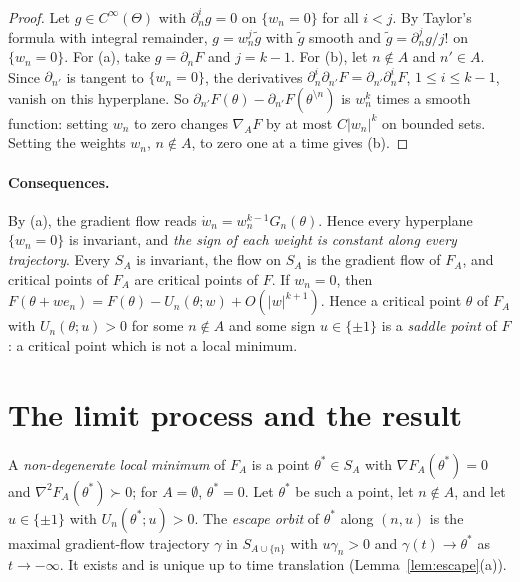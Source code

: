 \documentclass[11pt]{article}
\theoremstyle{definition}
\theoremstyle{remark}
\newcommand{\sm}{\setminus}
\begin{document}
\begin{proof}
Let $g\in C^\infty(\Theta)$ with $\partial_n^ig=0$ on $\{w_n=0\}$ for all $i<j$. By Taylor's formula with integral remainder, $g=w_n^j\tilde g$ with $\tilde g$ smooth and $\tilde g=\partial_n^jg/j!$ on $\{w_n=0\}$. For (a), take $g=\partial_nF$ and $j=k-1$. For (b), let $n\notin A$ and $n'\in A$. Since $\partial_{n'}$ is tangent to $\{w_n=0\}$, the derivatives $\partial_n^i\partial_{n'}F=\partial_{n'}\partial_n^iF$, $1\le i\le k-1$, vanish on this hyperplane. So $\partial_{n'}F(\theta)-\partial_{n'}F(\theta^{\sm n})$ is $w_n^k$ times a smooth function: setting $w_n$ to zero changes $\nabla_AF$ by at most $C|w_n|^k$ on bounded sets. Setting the weights $w_n$, $n\notin A$, to zero one at a time gives (b).
\end{proof}

\paragraph{Consequences.} By (a), the gradient flow reads $\dot w_n=w_n^{k-1}G_n(\theta)$. Hence every hyperplane $\{w_n=0\}$ is invariant, and \emph{the sign of each weight is constant along every trajectory}. Every $S_A$ is invariant, the flow on $S_A$ is the gradient flow of $F_A$, and critical points of $F_A$ are critical points of $F$. If $w_n=0$, then $F(\theta+we_n)=F(\theta)-U_n(\theta;w)+O(|w|^{k+1})$. Hence a critical point $\theta$ of $F_A$ with $U_n(\theta;u)>0$ for some $n\notin A$ and some sign $u\in\{\pm1\}$ is a \emph{saddle point} of $F$: a critical point which is not a local minimum.

\section{The limit process and the result}

A \emph{non-degenerate local minimum} of $F_A$ is a point $\theta^*\in S_A$ with $\nabla F_A(\theta^*)=0$ and $\nabla^2F_A(\theta^*)\succ0$; for $A=\emptyset$, $\theta^*=0$. Let $\theta^*$ be such a point, let $n\notin A$, and let $u\in\{\pm1\}$ with $U_n(\theta^*;u)>0$. The \emph{escape orbit} of $\theta^*$ along $(n,u)$ is the maximal gradient-flow trajectory $\gamma$ in $S_{A\cup\{n\}}$ with $u\gamma_n>0$ and $\gamma(t)\to\theta^*$ as $t\to-\infty$. It exists and is unique up to time translation (Lemma~\ref{lem:escape}(a)).
\end{document}
